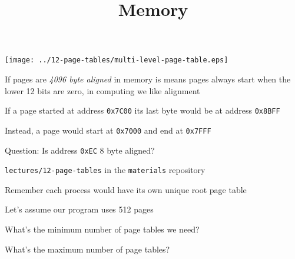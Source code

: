 

\title{Memory}



\begin{frame}
    \titlepage
\end{frame}

\begin{slide}


    \centering
    \texttt{[image: ../12-page-tables/multi-level-page-table.eps]}

\end{slide}

\begin{slide}
    

    If pages are \textit{4096 byte aligned} in memory is means pages always
    start when the lower 12 bits are zero, in computing we like alignment
    \medskip

    If a page started at address \texttt{0x7C00} its last byte would be at
    address \texttt{0x8BFF}
    \medskip

    Instead, a page would start at \texttt{0x7000} and end at \texttt{0x7FFF}
    \bigskip

    Question: Is address \texttt{0xEC} 8 byte aligned?
\end{slide}

\begin{slide}
    

    \texttt{lectures/12-page-tables} in the \texttt{materials} repository
    \medskip

    Remember each process would have its own unique root page table

\end{slide}

\begin{slide}
    

    Let's assume our program uses 512 pages
    \medskip

    What's the minimum number of page tables we need?
    \medskip

    What's the maximum number of page tables?

\end{slide}

